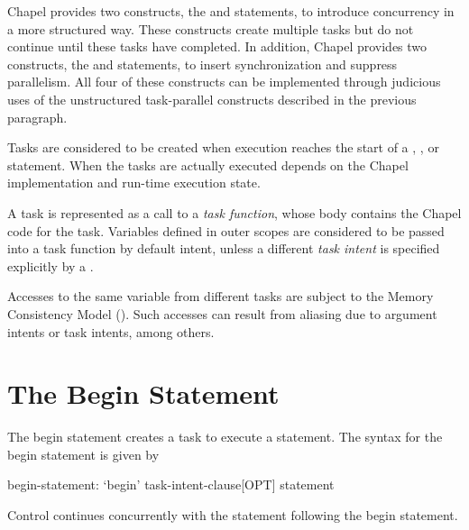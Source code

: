 Chapel provides two constructs, the  and  statements,
to introduce concurrency in a more structured way.  These constructs
create multiple tasks but do not continue until these tasks have
completed.  In addition, Chapel provides two constructs, the  and
 statements, to insert synchronization and suppress parallelism.
All four of these constructs can be implemented through judicious uses
of the unstructured task-parallel constructs described in the previous
paragraph.

Tasks are considered to be created when execution reaches the start
of a , , or  statement.
When the tasks are actually executed depends on the Chapel
implementation and run-time execution state.

A task is represented as a call to a \emph{task function}, whose body
contains the Chapel code for the task. Variables defined in outer
scopes are considered to be passed into a task function by default intent,
unless a different \emph{task intent} is specified explicitly
by a .

Accesses to the same variable from different tasks are subject
to the Memory Consistency Model ().
Such accesses can result from aliasing due to  argument intents
or task intents, among others.

\section{The Begin Statement}
\label{Begin}

The begin statement creates a task to execute a statement.  The syntax
for the begin statement is given by
\begin{syntax}
begin-statement:
  `begin' task-intent-clause[OPT] statement
\end{syntax}
Control continues concurrently with the statement following the
begin statement.

